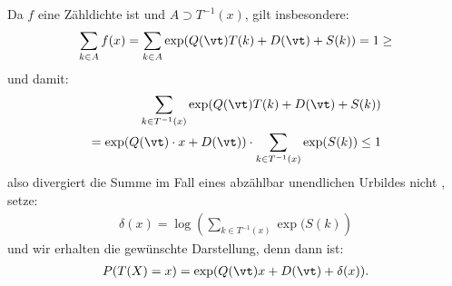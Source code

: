 \documentclass[12pt]{article}
\begin{document}
\begin{description}
{                                Da $f$ eine Zähldichte ist und $A\supset T^{-1}(x)$, gilt insbesondere:
                                \begin{align*}
                                        \sum_{k\in A}f(x)=\sum_{k\in A}\exp(Q(\vt)T(k)+D(\vt)+S(k))=1\geq 
                                \end{align*}
                                und damit:
                                \begin{align*}
                                        \sum_{k\in T^{-1}(x)} \exp(Q(\vt)T(k)+D(\vt)+S(k)) \\
                                        = \exp(Q(\vt)\cdot x+D(\vt)) \cdot \sum_{k\in T^{-1}(x)}\exp(S(k)) \leq 1
                                \end{align*}
                                also divergiert die Summe im Fall eines abzählbar unendlichen Urbildes nicht , setze:
                                \begin{align*}
                                        \delta(x)=\log\left(\sum_{k\in T^{-1}(x)}\exp(S(k)\right)
                                \end{align*}
                                und wir erhalten die gewünschte Darstellung, denn dann ist:
                                \begin{align*}
                                        P(T(X)=x)=\exp(Q(\vt)x+D(\vt)+\delta(x)).
                                \end{align*}}
                \end{description}
\end{document}
